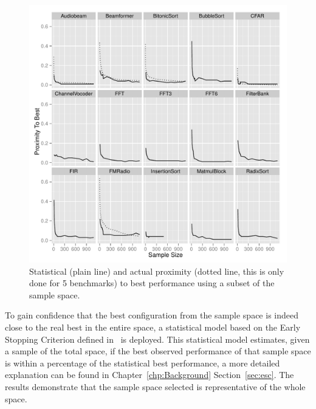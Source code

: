 \begin{figure}[t]
  \centering
    \includegraphics[width=1\textwidth]{streamit-paper/graphics/ESCProx.pdf}
    \caption{Statistical (plain line) and actual proximity (dotted line, this is only done for 5 benchmarks) to best performance using a subset of the sample space.}\label{fig:prox}
\end{figure}

To gain confidence that the best configuration from the sample space is indeed close to the real best in the entire space, a statistical model based on the Early Stopping Criterion defined in~\cite{vuduc2003AutomaticPerf} is deployed.
This statistical model estimates, given a sample of the total space, if the best observed performance of that sample space is within a percentage of the statistical best performance, a more detailed explanation can be found in Chapter~\ref{chp:Background} Section~\ref{sec:esc}.
The results demonstrate that the sample space selected is representative of the whole space.

